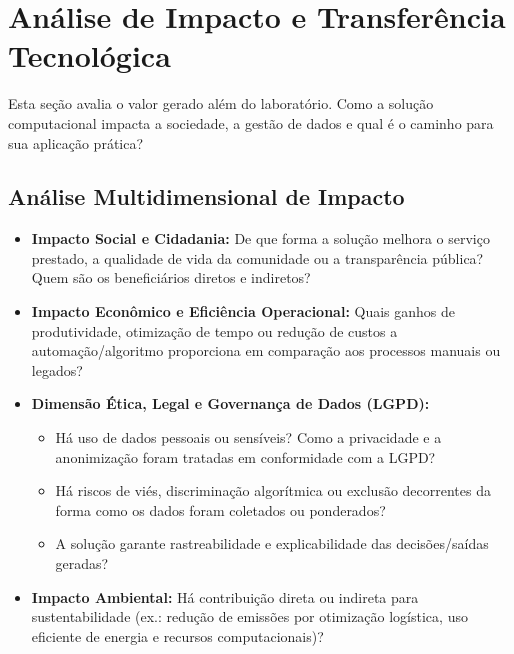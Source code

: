 \documentclass[11pt,a4paper]{article}
\begin{document}
\section{Análise de Impacto e Transferência Tecnológica}

\begin{instrucao}
Esta seção avalia o valor gerado além do laboratório. Como a solução computacional impacta a sociedade, a gestão de dados e qual é o caminho para sua aplicação prática?
\end{instrucao}

\subsection{Análise Multidimensional de Impacto}
\begin{itemize}
    \item \textbf{Impacto Social e Cidadania:} De que forma a solução melhora o serviço prestado, a qualidade de vida da comunidade ou a transparência pública? Quem são os beneficiários diretos e indiretos?
    \item \textbf{Impacto Econômico e Eficiência Operacional:} Quais ganhos de produtividade, otimização de tempo ou redução de custos a automação/algoritmo proporciona em comparação aos processos manuais ou legados?
    \item \textbf{Dimensão Ética, Legal e Governança de Dados (LGPD):}
    \begin{itemize}
        \item Há uso de dados pessoais ou sensíveis? Como a privacidade e a anonimização foram tratadas em conformidade com a LGPD?
        \item Há riscos de viés, discriminação algorítmica ou exclusão decorrentes da forma como os dados foram coletados ou ponderados?
        \item A solução garante rastreabilidade e explicabilidade das decisões/saídas geradas?
    \end{itemize}
    \item \textbf{Impacto Ambiental:} Há contribuição direta ou indireta para sustentabilidade (ex.: redução de emissões por otimização logística, uso eficiente de energia e recursos computacionais)?
\end{itemize}
\end{document}
